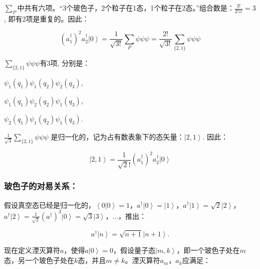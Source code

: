 $\sum\limits_P
{}$中共有六项。“3个玻色子，2个粒子在1态，1个粒子在2态。”组合数是：$\frac{3!}{2!1!}
= 3$, 即有2项是重复的。因此：

\begin{equation*}
\left( {a_1^\dag  } \right)^2 a_2^\dag  \left| 0 \right\rangle =
\frac{1} {{\sqrt {3!} }}\sum\limits_P {\psi \psi \psi }  =
\frac{{2!}} {{\sqrt {3!} }}\sum\limits_{\{ 2,1\} } {\psi \psi \psi }
\end{equation*}


$\sum\limits_{\{ 2,1\} } {\psi \psi \psi }$有3项, 分别是：

\begin{center}

$\psi_1(q_1)\psi_1(q_2)\psi_2(q_3)$,

$\psi_1(q_1)\psi_2(q_2)\psi_1(q_3)$,

$\psi_2(q_1)\psi_1(q_2)\psi_1(q_3)$.

\end{center}

$\frac{1}{\sqrt 3}\sum\limits_{\{ 2,1\} } {\psi \psi \psi }$
是归一化的，记为占有数表象下的态矢量：$\left| 2,1 \right\rangle$.
因此：

\begin{equation*}
\left| 2,1 \right\rangle = \frac{1}{\sqrt 2!} \left( {a_1^\dag  }
\right)^2 a_2^\dag  \left| 0 \right\rangle
\end{equation*}

\subsubsection{玻色子的对易关系：}

假设真空态已经是归一化的，$\left\langle 0 \right.\left| 0
\right\rangle  = 1$，$a^\dag  \left| 0 \right\rangle  = \left| 1
\right\rangle$，$a^\dag  \left| 1 \right\rangle  = \sqrt 2 \left| 2
\right\rangle$，$a^\dag  \left| 2 \right\rangle  = \frac{1}{{\sqrt 2
}}\left( {a^\dag  } \right)^3 \left| 0 \right\rangle  = \sqrt 3
\left| 3 \right\rangle $，...，推出：

\begin{equation}\label{boson recursion creat}
a^\dag  \left| n \right\rangle  = \sqrt {n + 1} \left| {n + 1}
\right\rangle .
\end{equation}


现在定义湮灭算符$a$，使得$a \left| 0 \right\rangle =
0$，假设量子态$\left| {m,k}
\right\rangle$，即一个玻色子处在$m$态，另一个玻色子处在$k$态，并且$m
\ne k$。湮灭算符$a_m$，$a_k$应满足：

